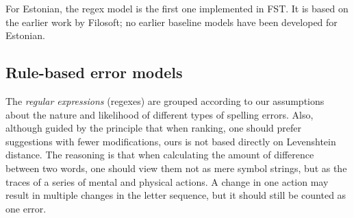 \documentclass{flammie}
\begin{document}
For Estonian, the regex model is the first one implemented in FST. It is based
on the earlier work by Filosoft; no earlier baseline models have been developed
for Estonian.

\subsection{Rule-based error models}

The \textit{regular expressions} (regexes) are grouped according to our
assumptions about the nature and likelihood of different types of spelling
errors. Also, although guided by the principle that when ranking, one should
prefer suggestions with fewer modifications, ours is not based directly on
Levenshtein distance. The reasoning is that when calculating the amount of
difference between two words, one should view them not as mere symbol strings,
but as the traces of a series of mental and physical actions. A change in one
action may result in multiple changes in the letter sequence, but it should
still be counted as one error.
\end{document}
